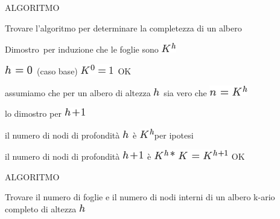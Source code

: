 \documentclass{article}
\begin{document}
{}

{ALGORITMO}

{Trovare l'algoritmo per determinare la completezza di un albero}

{}

{Dimostro}{~per induzione che le foglie sono
}\includegraphics{images/image86.png}{~}

{}

\includegraphics{images/image87.png}{~(caso base)
}\includegraphics{images/image88.png}{~OK}

{assumiamo che per un albero di altezza
}\includegraphics{images/image89.png}{~sia vero che
}\includegraphics{images/image90.png}

{lo dimostro per }\includegraphics{images/image91.png}

{}

{il numero di nodi di profondità
}\includegraphics{images/image89.png}{~è
}\includegraphics{images/image86.png}{per ipotesi}

{il numero di nodi di profondità
}\includegraphics{images/image91.png}{~è
}\includegraphics{images/image92.png}{~OK}

{}

{ALGORITMO}

{Trovare il numero di foglie e il numero di nodi interni di un albero
k-ario completo di altezza }\includegraphics{images/image89.png}{~}
\end{document}
